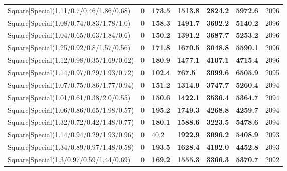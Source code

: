 \begin{tabular}{lrllllr}
 Square|Special(1.11/0.7/0.46/1.86/0.68)                       &             0   & \textbf{173.5} & \textbf{1513.8} & \textbf{2824.2} & \textbf{5972.6} &         2096 \\
 Square|Special(1.08/0.74/0.83/1.78/1.0)                       &             0   & \textbf{158.3} & \textbf{1491.7} & \textbf{3692.2} & \textbf{5140.2} &         2096 \\
 Square|Special(1.04/0.65/0.63/1.84/0.6)                       &             0   & \textbf{150.2} & \textbf{1391.2} & \textbf{3687.7} & \textbf{5253.2} &         2096 \\
 Square|Special(1.25/0.92/0.8/1.57/0.56)                       &             0   & \textbf{171.8} & \textbf{1670.5} & \textbf{3048.8} & \textbf{5590.1} &         2096 \\
 Square|Special(1.12/0.98/0.35/1.69/0.62)                      &             0   & \textbf{180.9} & \textbf{1477.1} & \textbf{4107.1} & \textbf{4715.4} &         2096 \\
 Square|Special(1.14/0.97/0.29/1.93/0.72)                      &             0   & \textbf{102.4} & \textbf{767.5}  & \textbf{3099.6} & \textbf{6505.9} &         2095 \\
 Square|Special(1.07/0.75/0.86/1.77/0.94)                      &             0   & \textbf{151.2} & \textbf{1314.9} & \textbf{3747.7} & \textbf{5260.4} &         2094 \\
 Square|Special(1.01/0.61/0.38/2.0/0.55)                       &             0   & \textbf{150.6} & \textbf{1422.1} & \textbf{3536.4} & \textbf{5364.7} &         2094 \\
 Square|Special(1.06/0.86/0.65/1.98/0.57)                      &             0   & \textbf{195.2} & \textbf{1749.3} & \textbf{4268.8} & \textbf{4259.7} &         2094 \\
 Square|Special(1.32/0.72/0.42/1.48/0.77)                      &             0   & \textbf{180.1} & \textbf{1588.6} & \textbf{3223.5} & \textbf{5478.6} &         2094 \\
 Square|Special(1.14/0.94/0.29/1.93/0.96)                      &             0   & 40.2           & \textbf{1922.9} & \textbf{3096.2} & \textbf{5408.9} &         2093 \\
 Square|Special(1.34/0.89/0.97/1.48/0.58)                      &             0   & \textbf{193.5} & \textbf{1628.4} & \textbf{4192.0} & \textbf{4452.8} &         2093 \\
 Square|Special(1.3/0.97/0.59/1.44/0.69)                       &             0   & \textbf{169.2} & \textbf{1555.3} & \textbf{3366.3} & \textbf{5370.7} &         2092 \\

\end{tabular}
